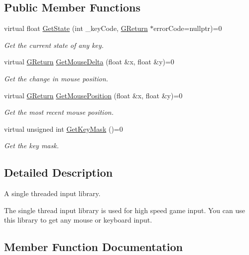\subsection*{Public Member Functions}
\begin{DoxyCompactItemize}
\item 
virtual float \hyperlink{classGW_1_1SYSTEM_1_1GInput_a7a3e93a3730d05cfeb92fc1dd93ad07a}{Get\+State} (int \+\_\+key\+Code, \hyperlink{namespaceGW_a67a839e3df7ea8a5c5686613a7a3de21}{G\+Return} $\ast$error\+Code=nullptr)=0
\begin{DoxyCompactList}\small\item\em Get the current state of any key. \end{DoxyCompactList}\item 
virtual \hyperlink{namespaceGW_a67a839e3df7ea8a5c5686613a7a3de21}{G\+Return} \hyperlink{classGW_1_1SYSTEM_1_1GInput_a2c968f0195241813dea705fb9a02a8b5}{Get\+Mouse\+Delta} (float \&x, float \&y)=0
\begin{DoxyCompactList}\small\item\em Get the change in mouse position. \end{DoxyCompactList}\item 
virtual \hyperlink{namespaceGW_a67a839e3df7ea8a5c5686613a7a3de21}{G\+Return} \hyperlink{classGW_1_1SYSTEM_1_1GInput_af0d0f1a00a2ebd04d5d697d1468c3c00}{Get\+Mouse\+Position} (float \&x, float \&y)=0
\begin{DoxyCompactList}\small\item\em Get the most recent mouse position. \end{DoxyCompactList}\item 
virtual unsigned int \hyperlink{classGW_1_1SYSTEM_1_1GInput_a071a399bc9c400f0cd333958d911c8c2}{Get\+Key\+Mask} ()=0
\begin{DoxyCompactList}\small\item\em Get the key mask. \end{DoxyCompactList}\end{DoxyCompactItemize}


\subsection{Detailed Description}
A single threaded input library. 

The single thread input library is used for high speed game input. You can use this library to get any mouse or keyboard input. 

\subsection{Member Function Documentation}

